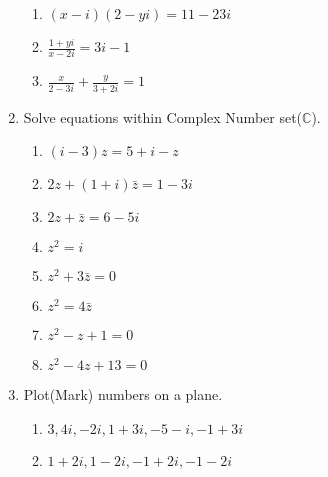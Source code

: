 \documentclass{article}
\begin{document}
\begin{enumerate}[1.]
\begin{enumerate}[(2.1)]
			\item $(x - i)(2 - yi) = 11 - 23i$
			
			\item $\frac{1 + yi}{x - 2i} = 3i - 1$
			
			\item $\frac{x}{2 - 3i} + \frac{y}{3+2i} = 1$
		\end{enumerate} 
		
		\item Solve equations within Complex Number set($\mathbb{C}$).
		\begin{enumerate}[(3.1)]
			\item $(i - 3)z = 5 + i - z$
			
			\item $2z + (1 + i)\bar{z} = 1 - 3i$
			
			\item $2z + \bar{z} = 6 - 5i$
			
			\item $z^2 = i$
			
			\item $z^2 + 3\bar{z} = 0$
			
			\item $z^2 = 4\bar{z}$
			
			\item $z^2 - z + 1 = 0$
			
			\item $z^2 - 4z + 13 = 0$
		\end{enumerate} 
		
		\item Plot(Mark) numbers on a plane.
		\begin{enumerate}[(4.1)]
			\item $3, 4i, -2i, 1 + 3i, -5 -i, -1 + 3i$
			
			\item $1 + 2i, 1 - 2i, -1 + 2i, -1 - 2i$
			
		\end{enumerate} 
	\end{enumerate} 
	
\end{document}

